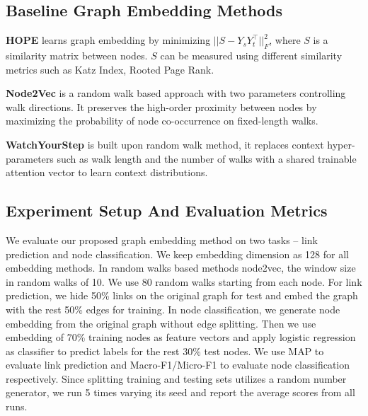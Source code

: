 \documentclass{article}
\begin{document}
\subsection{Baseline Graph Embedding Methods}


\textbf{HOPE\cite{ou2016asymmetric}} learns graph embedding by minimizing $||S - Y_sY_t^\intercal||_F^2$, where $S$ is a similarity matrix between nodes. $S$ can be measured using different similarity metrics such as Katz Index, Rooted Page Rank. 

\textbf{Node2Vec} is a random walk based approach with two parameters controlling walk directions. It preserves the high-order proximity between nodes by maximizing the probability of node co-occurrence on fixed-length walks. 

\textbf{WatchYourStep} is built upon random walk method, it replaces context hyper-parameters such as walk length and the number of walks with a shared trainable attention vector to learn context distributions.




\subsection{Experiment Setup And Evaluation Metrics}
We evaluate our proposed graph embedding method on two tasks -- link prediction and node classification. We keep embedding dimension as 128 for all embedding methods. In random walks based methods node2vec, the window size in random walks of 10. We use 80 random walks starting from each node. For link prediction, we hide 50\% links on the original graph for test and embed the graph with the rest 50\% edges for training. In node classification, we generate node embedding from the original graph without edge splitting. Then we use embedding of 70\% training nodes as feature vectors and apply logistic regression as classifier to predict labels for the rest 30\% test nodes. We use MAP to evaluate link prediction and Macro-F1/Micro-F1 to evaluate node classification respectively. Since splitting training and testing sets utilizes a random number generator, we run 5 times varying its seed and report the average scores from all runs.


 
\end{document}
